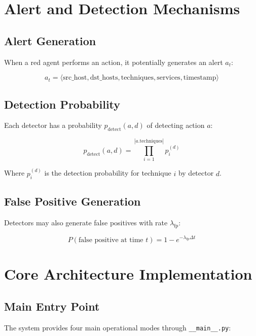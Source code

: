 \documentclass[12pt,a4paper]{article}
\begin{document}
\section{Alert and Detection Mechanisms}

\subsection{Alert Generation}
When a red agent performs an action, it potentially generates an alert $a_t$:

\begin{equation}
a_t = \langle \text{src\_host}, \text{dst\_hosts}, \text{techniques}, \text{services}, \text{timestamp} \rangle
\end{equation}

\subsection{Detection Probability}
Each detector has a probability $p_{\text{detect}}(a, d)$ of detecting action $a$:

\begin{equation}
p_{\text{detect}}(a, d) = \prod_{i=1}^{|a.\text{techniques}|} p_i^{(d)}
\end{equation}

Where $p_i^{(d)}$ is the detection probability for technique $i$ by detector $d$.

\subsection{False Positive Generation}
Detectors may also generate false positives with rate $\lambda_{\text{fp}}$:

\begin{equation}
P(\text{false positive at time } t) = 1 - e^{-\lambda_{\text{fp}} \Delta t}
\end{equation}

\section{Core Architecture Implementation}

\subsection{Main Entry Point}
The system provides four main operational modes through \texttt{\_\_main\_\_.py}:
\end{document}
